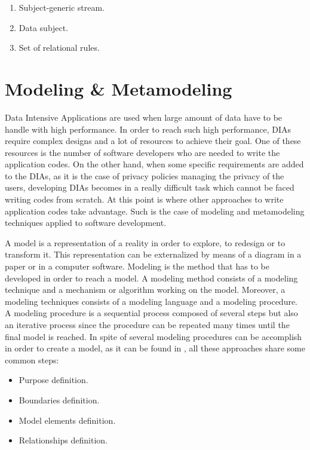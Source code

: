 \begin{enumerate}

\item Subject-generic stream.
\item Data subject.
\item Set of relational rules.

\end{enumerate}

\section{Modeling \& Metamodeling}

\label{Modeling and Metamodeling}

Data Intensive Applications are used when large amount of data have to be handle with high performance. In order to reach such high performance, DIAs require complex designs and a lot of resources to achieve their goal. One of these resources is the number of software developers who are needed to write the application codes. On the other hand, when some specific requirements are added to the DIAs, as it is the case of privacy policies managing the privacy of the users, developing DIAs becomes in a really difficult task which cannot be faced writing codes from scratch. At this point is where other approaches to write application codes take advantage. Such is the case of modeling and metamodeling techniques applied to software development.

A model is a representation of a reality in order to explore, to redesign or to transform it. This representation can be externalized by means of a diagram in a paper or in a computer software. Modeling is the method that has to be developed in order to reach a model. A modeling method consists of a modeling technique and a mechanism or algorithm working on the model. Moreover, a modeling techniques consists of a modeling language and a modeling procedure. A modeling procedure is a sequential process composed of several steps but also an iterative process since the procedure can be repeated many times until the final model is reached. In spite of several modeling procedures can be accomplish in order to create a model, as it can be found in \cite{modelwebsite}, all these approaches share some common steps:

\begin{itemize}

\item Purpose definition.
\item Boundaries definition.
\item Model elements definition.
\item Relationships definition.

\end{itemize}


